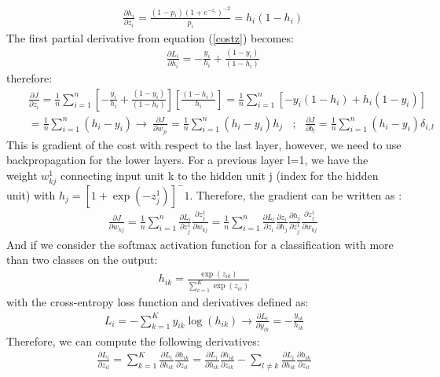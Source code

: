 \documentclass{article}
\begin{document}
\begin{eqnarray}
&&\frac{\partial{h_i}}{\partial{z_i}} =  \frac{(1-p_i)(1+e^{-z_i})^{-2} }{p_i}=h_i(1-h_i)
\end{eqnarray}
The first partial derivative from equation (\ref{costz}) becomes:
\begin{eqnarray}
&&\frac{\partial{L_i}}{\partial{h_i}} =  -\frac{y_i}{h_i} + \frac{(1-y_i)}{(1-h_i)}
\end{eqnarray}
therefore:
\begin{eqnarray}
&&\frac{\partial{J}}{\partial{z_i}} =  \frac{1}{n}\sum_{i=1}^{n} \left[-\frac{y_i}{h_i} + \frac{(1-y_i)}{(1-h_i)} \right] \left[  \frac{(1-h_i)}{h_i} \right] = \frac{1}{n}\sum_{i=1}^{n} [ -y_i(1-h_i) + h_i(1-y_i)] \nonumber \\ &&=  \frac{1}{n}\sum_{i=1}^{n}(h_i-y_i)  \longrightarrow ~ \frac{\partial{J}}{\partial{w_{ji}}} = \frac{1}{n}\sum_{i=1}^{n}(h_i-y_i) h_j~~~~;~~~ \frac{\partial{J}}{\partial{b_{l}}} = \frac{1}{n}\sum_{i=1}^{n}(h_i-y_i)\delta_{i,l}
\end{eqnarray}
This is gradient of the cost with respect to the last layer, however, we need to use backpropagation for the lower layers. For a previous layer l=1, we have the weight $w^1_{kj}$ connecting input unit k to the hidden unit j (index for the hidden unit) with $h_j = [1+ \exp(-z^1_j)]^-1$. Therefore, the gradient can be written as :
\begin{eqnarray}
&&\frac{\partial{J}}{\partial{w_{kj}}} =  \frac{1}{n}\sum_{i=1}^{n} \frac{\partial{L_i}}{\partial{z^1_j}}\frac{\partial{z^1_j}}{\partial{w_{kj}}} =\frac{1}{n}\sum_{i=1}^{n} \frac{\partial{L_i}}{\partial{z_i}}\frac{\partial{z_i}}{\partial{h_j}}\frac{\partial{h_j}}{\partial{z^1_j}}\frac{\partial{z^1_j}}{\partial{w_{kj}}}
\label{der-cost-w}
\end{eqnarray}
And if we consider the softmax activation function for a classification with more than two classes on the output:
\begin{eqnarray}
h_{ik} = \frac{\exp(z_{ik})}{\sum_{c=1}^K \exp(z_{ic})}
\end{eqnarray}
with the cross-entropy loss function and derivatives defined as:
\begin{eqnarray}
L_i = -{\sum_{k=1}^K y_{ik}\log(h_{ik})} \longrightarrow \frac{\partial L_i}{\partial y_{ik}} = -\frac{y_{ik}}{h_{ik}}
\end{eqnarray}
Therefore, we can compute the following derivatives:
\begin{eqnarray}
\frac{\partial L_i}{\partial z_{il}} = \sum_{k=1}^K \frac{\partial L_i}{\partial h_{ik}}\frac{\partial h_{ik}}{\partial z_{il}} = \frac{\partial L_i}{\partial h_{ik}}\frac{\partial h_{ik}}{\partial z_{ik}} - \sum_{l \neq k} \frac{\partial L_i}{\partial h_{ik}}\frac{\partial h_{ik}}{\partial z_{il}} 
\label{deriv-cost-2}
\end{eqnarray}
\end{document}
